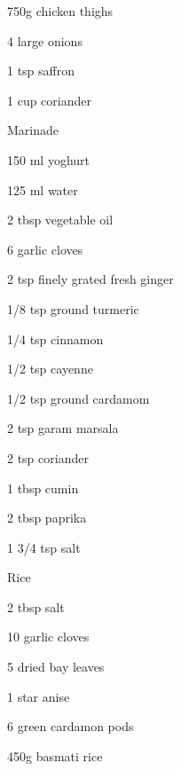 

\begin{ingredient}
    \begin{main}
        \item 750g chicken thighs
        \item 4 large onions
        \item 1 tsp saffron
        \item 1 cup coriander
    \end{main}
    \begin{subingredient}{Marinade}
        \item 150 ml yoghurt
        \item 125 ml water
        \item 2 tbsp vegetable oil
        \item 6 garlic cloves
        \item 2 tsp finely grated fresh ginger
        \item 1/8 tsp ground turmeric
        \item 1/4 tsp cinnamon
        \item 1/2 tsp cayenne
        \item 1/2 tsp ground cardamom
        \item 2 tsp garam marsala
        \item 2 tsp coriander
        \item 1 tbsp cumin
        \item 2 tbsp paprika
        \item 1 3/4 tsp salt
    \end{subingredient}
    \begin{subingredient}{Rice}
        \item 2 tbsp salt
        \item 10 garlic cloves
        \item 5 dried bay leaves
        \item 1 star anise
        \item 6 green cardamon pods
        \item 450g basmati rice
    \end{subingredient}
\end{ingredient} %
